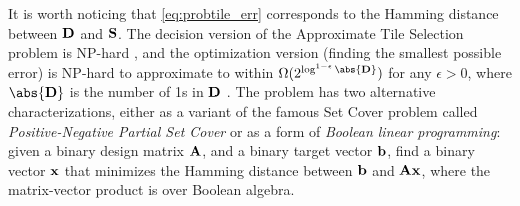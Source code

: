 It is worth noticing that \eqref{eq:probtile_err} corresponds to the Hamming distance between $\mathbf{D}$ and $\mathbf{S}$. The decision version of the Approximate Tile Selection problem is NP-hard \parencite{miettinen15generalized}, and the optimization version (finding the smallest possible error) is NP-hard to approximate to within $\Omega(2^{\log^{1-\epsilon}\abs{\mD}})$ for any $\epsilon > 0$, where $\abs{\mD}$ is the number of 1s in $\mathbf{D}$ \parencite{miettinen15generalized}. The problem has two alternative characterizations, either as a variant of the famous Set Cover problem called \emph{Positive-Negative Partial Set Cover} \parencite{miettinen08positive-negative} or as a form of \emph{Boolean linear programming}: given a binary design matrix $\mathbf{A}$, and a binary target vector $\mathbf{b}$, find a binary vector $\mathbf{x}$ that minimizes the Hamming distance between $\mathbf{b}$ and $\mathbf{A}\mathbf{x}$, where the matrix-vector product is over Boolean algebra. 





